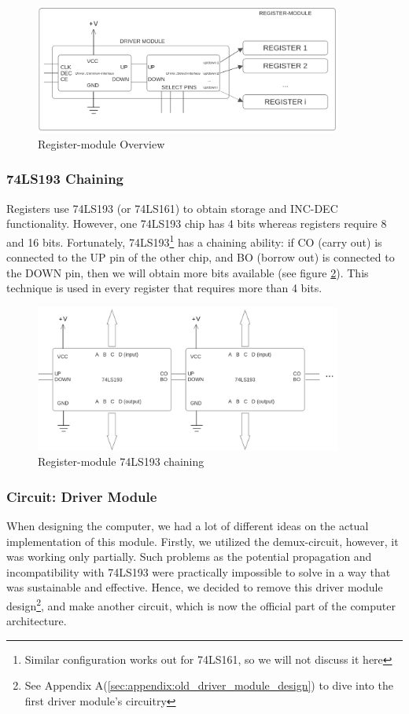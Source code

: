 \begin{figure}[H]
	\centering
	\includegraphics[width=0.9\textwidth]{img/register_module_overview}
	\caption{Register-module Overview}
	\label{fig:registerModuleOverview}
\end{figure}

\subsubsection{74LS193 Chaining}
Registers use 74LS193 (or 74LS161) to obtain storage and INC-DEC functionality. However, one 74LS193 chip has 4 bits whereas registers require 8 and 16 bits. Fortunately, 74LS193\footnote{Similar configuration works out for 74LS161, so we will not discuss it here} has a chaining ability: if CO (carry out) is connected to the UP pin of the other chip, and BO (borrow out) is connected to the DOWN pin, then we will obtain more bits available (see figure \ref{fig:registerModuleChaining}). This technique is used in every register that requires more than 4 bits.

\begin{figure}[H]
	\centering
	\includegraphics[width=0.9\textwidth]{img/register_module_chaining}
	\caption{Register-module 74LS193 chaining}
	\label{fig:registerModuleChaining}
\end{figure}

\subsubsection{Circuit: Driver Module}
When designing the computer, we had a lot of different ideas on the actual implementation of this module. Firstly, we utilized the demux-circuit, however, it was working only partially. Such problems as the potential propagation and incompatibility with 74LS193 were practically impossible to solve in a way that was sustainable and effective. Hence, we decided to remove this driver module design\footnote{See Appendix A(\ref{sec:appendix:old_driver_module_design})  to dive into the first driver module's circuitry}, and make another circuit, which is now the official part of the computer architecture. 

